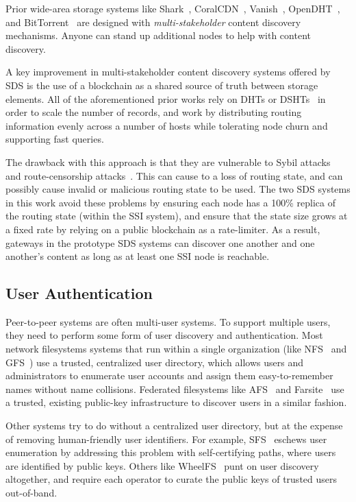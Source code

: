 Prior wide-area storage systems like Shark~\cite{shark}, CoralCDN~\cite{coral}, Vanish~\cite{vanish},
OpenDHT~\cite{opendht}, and BitTorrent~\cite{bittorrent} are designed with
\emph{multi-stakeholder} content discovery mechanisms.  Anyone can stand up additional
nodes to help with content discovery.

A key improvement in multi-stakeholder content discovery systems offered by SDS
is the use of a blockchain as a shared source of truth between storage elements.
All of the aforementioned prior works rely on DHTs or DSHTs~\cite{dsht} in order to
scale the number of records, and work by distributing routing information
evenly across a number of hosts while tolerating node churn and supporting
fast queries.

The drawback with this approach is that they are vulnerable to Sybil
attacks~\cite{sybil-attack} and route-censorship
attacks~\cite{dht-route-censorship}.  This can cause to a loss of routing state,
and can possibly cause invalid or malicious routing state to be used.
The two SDS systems in this work avoid these problems by ensuring each node has a 100\% replica of the
routing state (within the SSI system), and ensure that the state size grows at a fixed rate by relying
on a public blockchain as a rate-limiter.  As a result, gateways in the
prototype SDS systems can discover one another and one another's content as long
as at least one SSI node is reachable.

\subsection{User Authentication}

Peer-to-peer systems are often multi-user systems.  To support multiple users,
they need to perform some form of user discovery and authentication.
Most network filesystems systems that run within a single organization (like
NFS~\cite{nfs} and GFS~\cite{gfs}) use a trusted, centralized user directory,
which allows users and administrators to enumerate user accounts and assign them
easy-to-remember names without name collisions.
Federated filesystems like AFS~\cite{afs} and Farsite~\cite{farsite} use a
trusted, existing public-key infrastructure to discover users in a similar
fashion.

Other systems try to do without a centralized user directory, but at the expense
of removing human-friendly user identifiers.  For example,
SFS~\cite{sfs} eschews user enumeration by addressing this problem with
self-certifying paths, where users are identified by public keys.
Others like WheelFS~\cite{wheelfs} punt on user discovery altogether, and
require each operator to curate the public keys of trusted users out-of-band.

